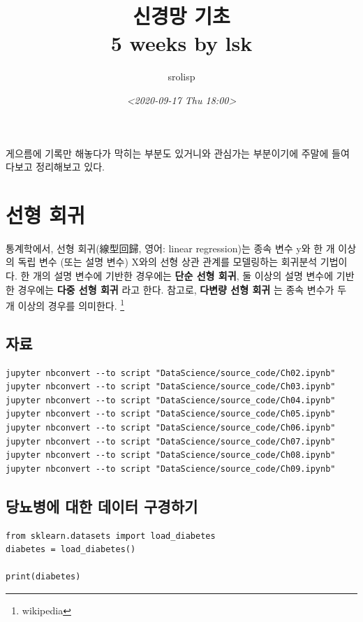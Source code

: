 \documentclass[11pt]{article}
\author{srolisp}
\date{\textit{<2020-09-17 Thu 18:00>}}
\title{신경망 기초\\\medskip
\large 5 weeks by lsk}
\begin{document}
\maketitle
\tableofcontents

게으름에 기록만 해놓다가 막히는 부분도 있거니와 관심가는 부분이기에 주말에 들여다보고 정리해보고 있다.

\section{선형 회귀}
\label{sec:org56bea04}
통계학에서, 선형 회귀(線型回歸, 영어: linear regression)는 종속 변수 y와 한 개 이상의 독립 변수 (또는 설명 변수) X와의 선형 상관 관계를 모델링하는 회귀분석 기법이다. 한 개의 설명 변수에 기반한 경우에는 \textbf{단순 선형 회귀}, 둘 이상의 설명 변수에 기반한 경우에는 \textbf{다중 선형 회귀} 라고 한다. 참고로, \textbf{다변량 선형 회귀} 는 종속 변수가 두 개 이상의 경우를 의미한다. \footnote{wikipedia}

\subsection{자료}
\label{sec:org36d574c}
\begin{verbatim}
jupyter nbconvert --to script "DataScience/source_code/Ch02.ipynb" 
jupyter nbconvert --to script "DataScience/source_code/Ch03.ipynb"
jupyter nbconvert --to script "DataScience/source_code/Ch04.ipynb"
jupyter nbconvert --to script "DataScience/source_code/Ch05.ipynb"
jupyter nbconvert --to script "DataScience/source_code/Ch06.ipynb"
jupyter nbconvert --to script "DataScience/source_code/Ch07.ipynb"
jupyter nbconvert --to script "DataScience/source_code/Ch08.ipynb"
jupyter nbconvert --to script "DataScience/source_code/Ch09.ipynb"
\end{verbatim}

\subsection{당뇨병에 대한 데이터 구경하기}
\label{sec:orgb873888}

\begin{verbatim}
from sklearn.datasets import load_diabetes 
diabetes = load_diabetes()

print(diabetes)
\end{verbatim}
\end{document}
